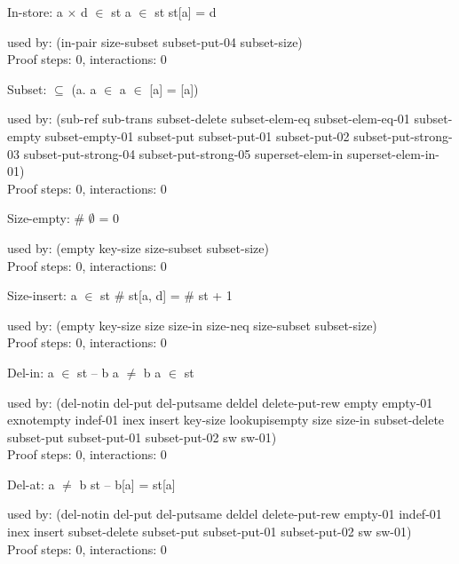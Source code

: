 \documentclass[a4paper]{article}
\begin{document}
\medskip

In-store: 
 \Fol a $\times$ d $\in$ st \Equiv a $\in$ st \And st[a] = d


used by: (in-pair size-subset subset-put-04 subset-size)\\
Proof steps: 0, interactions: 0

\medskip

Subset: 
 \Fol {} $\subseteq$  \Equiv (\All a. a $\in$  \Imp a $\in$  \And {}[a] = [a])


used by: (sub-ref sub-trans subset-delete subset-elem-eq
          subset-elem-eq-01 subset-empty subset-empty-01 subset-put
          subset-put-01 subset-put-02 subset-put-strong-03
          subset-put-strong-04 subset-put-strong-05 superset-elem-in
          superset-elem-in-01)\\
Proof steps: 0, interactions: 0

\medskip

Size-empty: 
 \Fol \# $\emptyset$ = 0


used by: (empty key-size size-subset subset-size)\\
Proof steps: 0, interactions: 0

\medskip

Size-insert: 
 \Fol \Not a $\in$ st \Imp \# st[a, d] = \# st + 1


used by: (empty key-size size size-in size-neq size-subset
          subset-size)\\
Proof steps: 0, interactions: 0

\medskip

Del-in: 
 \Fol a $\in$ st -- b \Equiv a $\neq$ b \And a $\in$ st


used by: (del-notin del-put del-putsame deldel delete-put-rew empty
          empty-01 exnotempty indef-01 inex insert key-size
          lookupisempty size size-in subset-delete subset-put
          subset-put-01 subset-put-02 sw sw-01)\\
Proof steps: 0, interactions: 0

\medskip

Del-at: 
 \Fol a $\neq$ b \Imp st -- b[a] = st[a]


used by: (del-notin del-put del-putsame deldel delete-put-rew empty-01
          indef-01 inex insert subset-delete subset-put subset-put-01
          subset-put-02 sw sw-01)\\
Proof steps: 0, interactions: 0

\medskip
\end{document}
